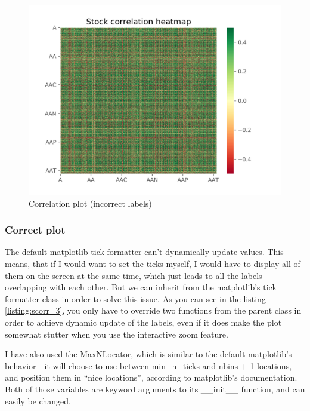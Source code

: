 \documentclass[12pt, a4paper]{article}
\begin{document}
\bgroup
  \inputminted[linenos, breaklines=true, fontsize=\scriptsize, firstnumber=last]{python}{src/stocks/corr/2_problem_labels.py}
  \label{listing:scorr_2}
\egroup

\begin{figure}[H]
    \centering
    \includegraphics[width=\textwidth]{src/stocks/corr/corr}
    \caption{Correlation plot (incorrect labels)}
    \label{fig:stock_corr}
\end{figure}

\subsubsection{Correct plot}\label{sssec:correct_corr_plot}

The default matplotlib tick formatter can’t dynamically update values. This means, that if I would want to set the ticks myself, I would have to display all of them on the screen at the same time, which just leads to all the labels overlapping with each other. But we can inherit from the matplotlib’s tick formatter class in order to solve this issue. As you can see in the listing \ref{listing:scorr_3}, you only have to override two functions from the parent class in order to achieve dynamic update of the labels, even if it does make the plot somewhat stutter when you use the interactive zoom feature.

I have also used the MaxNLocator, which is similar to the default matplotlib’s behavior - it will choose to use between min\_n\_ticks and nbins + 1 locations, and position them in “nice locations”, according to matplotlib’s documentation. Both of those variables are keyword arguments to its \_\_init\_\_ function, and can easily be changed.
\end{document}

